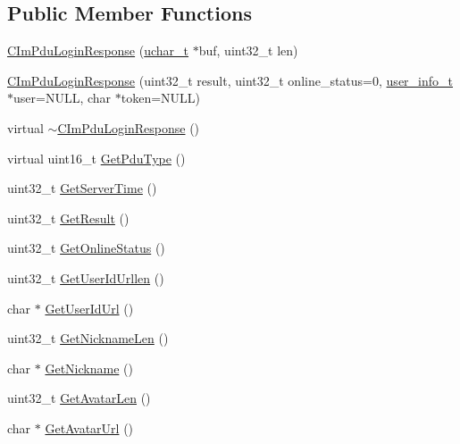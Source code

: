 \subsection*{Public Member Functions}
\begin{DoxyCompactItemize}
\item 
\hyperlink{class_c_im_pdu_login_response_a78f80ef32815ba702adfbddf219cfa90}{C\+Im\+Pdu\+Login\+Response} (\hyperlink{base_2ostype_8h_a124ea0f8f4a23a0a286b5582137f0b8d}{uchar\+\_\+t} $\ast$buf, uint32\+\_\+t len)
\item 
\hyperlink{class_c_im_pdu_login_response_a866dc146dc2260a295919d1ef97deea7}{C\+Im\+Pdu\+Login\+Response} (uint32\+\_\+t result, uint32\+\_\+t online\+\_\+status=0, \hyperlink{structuser__info__t}{user\+\_\+info\+\_\+t} $\ast$user=N\+U\+L\+L, char $\ast$token=N\+U\+L\+L)
\item 
virtual \hyperlink{class_c_im_pdu_login_response_a9d9166a80ce9b64db7eddfdf6766ab49}{$\sim$\+C\+Im\+Pdu\+Login\+Response} ()
\item 
virtual uint16\+\_\+t \hyperlink{class_c_im_pdu_login_response_a21b4af0c479340cdb5cce734ef812f29}{Get\+Pdu\+Type} ()
\item 
uint32\+\_\+t \hyperlink{class_c_im_pdu_login_response_a0f17ceccf767372aa2599e01182c853e}{Get\+Server\+Time} ()
\item 
uint32\+\_\+t \hyperlink{class_c_im_pdu_login_response_a8d64e694bb362a8172fa313043931410}{Get\+Result} ()
\item 
uint32\+\_\+t \hyperlink{class_c_im_pdu_login_response_ac41bfe05dd79baaadc92898c10017942}{Get\+Online\+Status} ()
\item 
uint32\+\_\+t \hyperlink{class_c_im_pdu_login_response_a541a249417279fa1475a623d9b49ce1d}{Get\+User\+Id\+Urllen} ()
\item 
char $\ast$ \hyperlink{class_c_im_pdu_login_response_a4e895324459987653f8a731c2a2c93ee}{Get\+User\+Id\+Url} ()
\item 
uint32\+\_\+t \hyperlink{class_c_im_pdu_login_response_a6012d35eff76180517ed77209f69494e}{Get\+Nickname\+Len} ()
\item 
char $\ast$ \hyperlink{class_c_im_pdu_login_response_a75a865b43db58d9193fc2925d6ae3142}{Get\+Nickname} ()
\item 
uint32\+\_\+t \hyperlink{class_c_im_pdu_login_response_a30631b4bc068b35d40595e7ee235512c}{Get\+Avatar\+Len} ()
\item 
char $\ast$ \hyperlink{class_c_im_pdu_login_response_a3937c6fd6691f81c55ceb20d39b87e68}{Get\+Avatar\+Url} ()
\item 

\end{DoxyCompactItemize}
